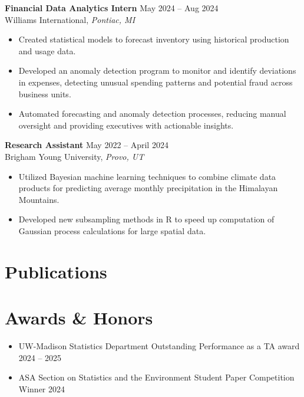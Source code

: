 \documentclass[11pt, letterpaper]{article}
\begin{document}
\vspace{6pt}
\textbf{Financial Data Analytics Intern} \hfill May 2024 -- Aug 2024 \\
\tab Williams International, \textit{Pontiac, MI}
\begin{itemize}
    \item Created statistical models to forecast inventory using historical production and usage data.
    \item Developed an anomaly detection program to monitor and identify deviations in expenses, detecting unusual spending patterns and potential fraud across business units.
    \item Automated forecasting and anomaly detection processes, reducing manual oversight and providing executives with actionable insights.
\end{itemize}

\vspace{6pt}
\textbf{Research Assistant} \hfill May 2022 -- April 2024 \\
\tab Brigham Young University, \textit{Provo, UT}
\begin{itemize}
    \item Utilized Bayesian machine learning techniques to combine climate data products for predicting average monthly precipitation in the Himalayan Mountains.
    \item Developed new subsampling methods in R to speed up computation of Gaussian process calculations for large spatial data.
\end{itemize}


\section{Publications}
\nocite{*} 
\printbibliography[heading=none] 

\section{Awards \& Honors}
\begin{itemize}
    \item UW-Madison Statistics Department Outstanding Performance as a TA award \hfill 2024 -- 2025
    \item ASA Section on Statistics and the Environment Student Paper Competition Winner \hfill 2024
\end{itemize}
\end{document}
